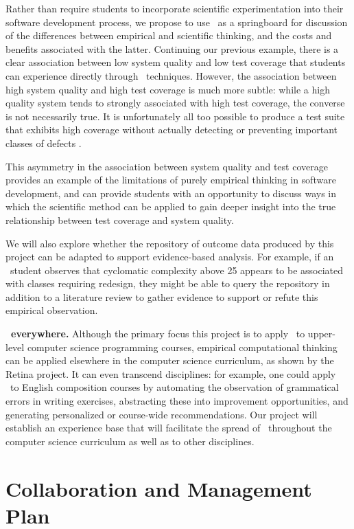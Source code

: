 Rather than require students to incorporate scientific experimentation into
their software development process, we propose to use \eCT\ as a
springboard for discussion of the differences between empirical and
scientific thinking, and the costs and benefits associated with the latter.
Continuing our previous example, there is a clear association between low
system quality and low test coverage that students can experience directly
through \eCT\ techniques.  However, the association between high system
quality and high test coverage is much more subtle: while a high quality
system tends to strongly associated with high test coverage, the converse
is not necessarily true. It is unfortunately all too possible to produce a
test suite that exhibits high coverage without actually detecting or
preventing important classes of defects \citep{Marick99}.

This asymmetry in the association between system quality and test coverage
provides an example of the limitations of purely empirical thinking in
software development, and can provide students with an opportunity to discuss 
ways in which the scientific method can be applied to gain deeper insight into 
the true relationship between test coverage and system quality.  

We will also explore whether the repository of outcome data produced by
this project can be adapted to support evidence-based analysis. For
example, if an \eCT\ student observes that cyclomatic complexity above 25
appears to be associated with classes requiring redesign, they might be
able to query the repository in addition to a literature review to gather
evidence to support or refute this empirical observation.

{\bf \eCT\ everywhere.}  Although the primary focus this project is to
apply \eCT\ to upper-level computer science programming courses, empirical
computational thinking can be applied elsewhere in the computer science
curriculum, as shown by the Retina project.  It can even transcend
disciplines: for example, one could apply \eCT\ to English composition
courses by automating the observation of grammatical errors in writing
exercises, abstracting these into improvement opportunities, and generating
personalized or course-wide recommendations.  Our project will establish an
experience base that will facilitate the spread of \eCT\ throughout the
computer science curriculum as well as to other disciplines.



\section{Collaboration and Management Plan}

